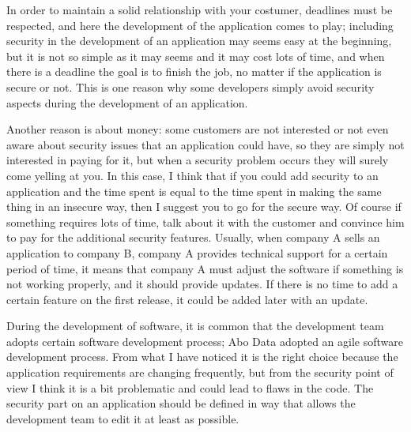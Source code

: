 In order to maintain a solid relationship with your costumer, deadlines must be respected, and here the development of the application comes to play; including security in the development of an application may seems easy at the beginning, but it is not so simple as it may seems and it may cost lots of time, and when there is a deadline the goal is to finish the job, no matter if the application is secure or not.\newline
This is one reason why some developers simply avoid security aspects during the development of an application.\newline

Another reason is about money: some customers are not interested or not even aware about security issues that an application could have, so they are simply not interested in paying for it, but when a security problem occurs they will surely come yelling at you.\newline
In this case, I think that if you could add security to an application and the time spent is equal to the time spent in making the same thing in an insecure way, then I suggest you to go for the secure way.\newline
Of course if something requires lots of time, talk about it with the customer and convince him to pay for the additional security features.\newline
Usually, when company A sells an application to company B, company A provides technical support for a certain period of time, it means that company A must adjust the software if something is not working properly, and it should provide updates.
If there is no time to add a certain feature on the first release, it could be added later with an update.\newline

During the development of software, it is common that the development team adopts certain software development process; Abo Data adopted an agile software development process.\newline
From what I have noticed it is the right choice because the application requirements are changing frequently, but from the security point of view I think it is a bit problematic and could lead to flaws in the code.\newline
The security part on an application should be defined in way that allows the development team to edit it at least as possible.\newline

